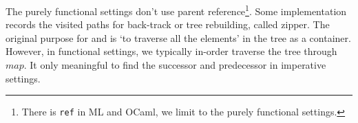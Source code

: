 \documentclass[b5paper]{article}
\begin{document}
The purely functional settings don't use parent reference\footnote{There is \texttt{ref} in ML and OCaml, we limit to the purely functional settings.}. Some implementation records the visited paths for back-track or tree rebuilding, called zipper\cite{zipper-hbook}. The original purpose for  and  is `to traverse all the elements' in the tree as a container. However, in functional settings, we typically in-order traverse the tree through $map$. It only meaningful to find the successor and predecessor in imperative settings.

\begin{Exercise}\label{ex:bst-lookup}


\end{Exercise}
\end{document}
